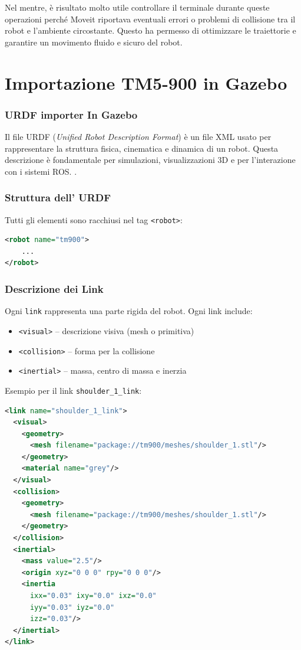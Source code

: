 \documentclass[11pt]{report}
\begin{document}
Nel mentre, è risultato molto utile controllare il terminale durante queste operazioni perché Moveit riportava eventuali errori o problemi di collisione tra il robot e l'ambiente circostante. Questo ha permesso di ottimizzare le traiettorie e garantire un movimento fluido e sicuro del robot.

\section{Importazione TM5-900 in Gazebo}
\label{sec:Importazione_TM5-900_Gazebo}

\subsubsection{URDF importer In Gazebo}
Il file URDF (\textit{Unified Robot Description Format}) è un file XML usato per rappresentare la struttura fisica, cinematica e dinamica di un robot. Questa descrizione è fondamentale per simulazioni, visualizzazioni 3D e per l'interazione con i sistemi ROS.
.

\subsubsection*{Struttura dell' URDF}

Tutti gli elementi sono racchiusi nel tag \texttt{<robot>}:

\begin{lstlisting}[language=xml]
<robot name="tm900">
    ...
</robot>
\end{lstlisting}

\subsubsection*{Descrizione dei Link}

Ogni \texttt{link} rappresenta una parte rigida del robot. Ogni link include:

\begin{itemize}
    \item \texttt{<visual>} – descrizione visiva (mesh o primitiva)
    \item \texttt{<collision>} – forma per la collisione
    \item \texttt{<inertial>} – massa, centro di massa e inerzia
\end{itemize}

Esempio per il link \texttt{shoulder\_1\_link}:

\begin{lstlisting}[language=xml]
<link name="shoulder_1_link">
  <visual>
    <geometry>
      <mesh filename="package://tm900/meshes/shoulder_1.stl"/>
    </geometry>
    <material name="grey"/>
  </visual>
  <collision>
    <geometry>
      <mesh filename="package://tm900/meshes/shoulder_1.stl"/>
    </geometry>
  </collision>
  <inertial>
    <mass value="2.5"/>
    <origin xyz="0 0 0" rpy="0 0 0"/>
    <inertia
      ixx="0.03" ixy="0.0" ixz="0.0"
      iyy="0.03" iyz="0.0"
      izz="0.03"/>
  </inertial>
</link>
\end{lstlisting}
\end{document}
